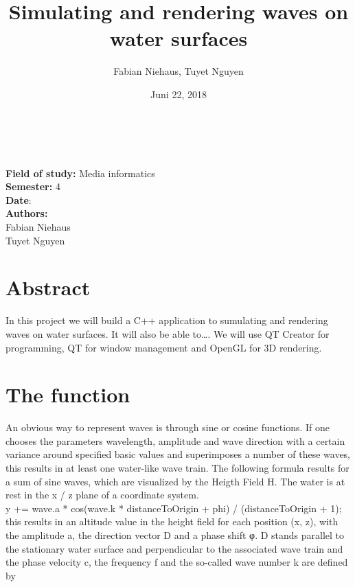 \documentclass[12pt,a4paper]{scrartcl}
\title{Simulating and rendering waves on water surfaces}
\author{Fabian Niehaus, Tuyet Nguyen}
\date{Juni 22, 2018}
\begin{document}
\begin{titlepage}
	\centering
	\ \\[2cm]
	{\huge\textbf{\@title}} 
	\\[3cm]
	\large
	\textbf{Field of study:} Media informatics \\
	\textbf{Semester:} 4
	\\[2cm]
	\textbf{Date}: \@date
	\\[2cm]
	\textbf {Authors:}
	\\Fabian Niehaus
	\\Tuyet Nguyen
\end{titlepage}

\newpage
\setcounter{page}{0}
\tableofcontents
\newpage
\listoffigures

\newpage
\ofoot[]{\pagemark}
\normalsize

\section{Abstract}
In this project we will build a C++ application to sumulating and rendering waves on water surfaces. It will also be able to…. We will use QT Creator for programming, QT for window management and OpenGL for 3D rendering.
\section{The function}
An obvious way to represent waves is through sine or cosine functions. If one chooses the parameters wavelength, amplitude and wave direction with a certain variance around specified basic values and superimposes a number of these waves, this results in at least one water-like wave train. The following formula results for a sum of sine waves, which are visualized by the Heigth Field H. The water is at rest in the x / z plane of a coordinate system.\\

y += wave.a * cos(wave.k * distanceToOrigin + phi) / (distanceToOrigin + 1);\\

this results in an altitude value in the height field for each position (x, z), with the amplitude a, the direction vector D and a phase shift φ. D stands parallel to the stationary water surface and perpendicular to the associated wave train and the phase velocity c, the frequency f and the so-called wave number k are defined by \\
\end{document}
